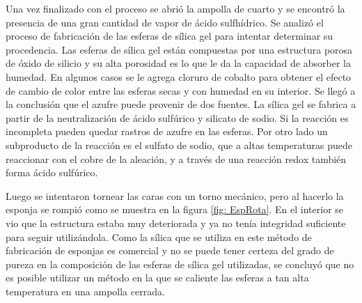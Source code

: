 \documentclass[a4paper,12pt,fleqn,twoside,openany]{book}
\begin{document}
Una vez finalizado con el proceso se abrió la ampolla de cuarto y se encontró la presencia de una gran cantidad de vapor de ácido sulfhídrico. Se analizó el proceso de fabricación de las esferas de sílica gel para intentar determinar su procedencia. Las esferas de sílica gel están compuestas por una estructura porosa de óxido de silicio y su alta porosidad es lo que le da la capacidad de absorber la humedad. En algunos casos se le agrega cloruro de cobalto para obtener el efecto de cambio de color entre las esferas secas y con humedad en su interior. Se llegó a la conclusión que el azufre puede provenir de dos fuentes. La sílica gel se fabrica a partir de la neutralización de ácido sulfúrico y silicato de sodio. Si la reacción es incompleta pueden quedar rastros de azufre en las esferas. Por otro lado un subproducto de la reacción es el sulfato de sodio, que a altas temperaturas puede reaccionar con el cobre de la aleación, y a través de una reacción redox también  forma ácido sulfúrico. 

Luego se intentaron tornear las caras con un torno mecánico, pero al hacerlo la esponja se rompió como se muestra en la figura \ref{fig: EspRota}. En el interior se vio que la estructura estaba muy deteriorada y ya no tenía integridad suficiente para seguir utilizándola. Como la sílica que se utiliza en este método de fabricación de esponjas es comercial y no se puede tener certeza del grado de pureza en la composición de las esferas de sílica gel utilizadas, se concluyó que no es posible utilizar un método en la que se caliente las esferas a tan alta temperatura en una ampolla cerrada. 




% 
\end{document}
